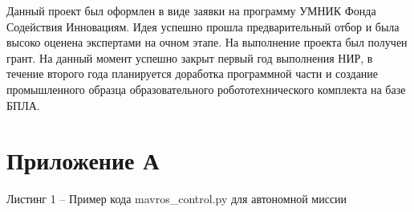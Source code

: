 \documentclass[a4paper,12pt]{article}
\begin{document}
Данный проект был оформлен в виде заявки на программу УМНИК Фонда Содействия Инновациям. Идея успешно прошла предварительный отбор \cite{umnik} и была высоко оценена экспертами на очном этапе. На выполнение проекта был получен грант. На данный момент успешно закрыт первый год выполнения НИР, в течение второго года планируется доработка программной части и создание промышленного образца образовательного робототехнического комплекта на базе БПЛА.
\pagebreak

\printbibliography

\pagebreak
\section*{ \centering Приложение А} 

\begin{center}
	Листинг 1 -- Пример кода mavros\_control.py для автономной миссии
\end{center}
\end{document}
